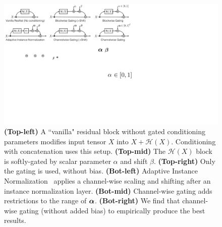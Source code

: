 \documentclass[10pt,twocolumn,letterpaper]{article}
\newcommand{\rz}[1]{\textbf{\textcolor[rgb]{.54, .16, .55}{RZ: #1}}}
\begin{document}
\begin{figure}[t]
    \centering
    \includegraphics[width=.9\linewidth]{paper_images/arch_gate2.pdf}
    \caption{
    {\bf (Top-left)} A ``vanilla" residual block without gated conditioning parameters modifies input tensor $X$ into $X+\mathcal{H}(X)$. Conditioning with concatenation uses this setup. {\bf (Top-mid)} The $\mathcal{H}(X)$ block is softly-gated by scalar parameter $\alpha$ and shift $\beta$. {\bf (Top-right)} Only the gating is used, without bias. {\bf (Bot-left)} Adaptive Instance Normalization~\cite{huang2017arbitrary} applies a channel-wise scaling and shifting after an instance normalization layer. {\bf (Bot-mid)} Channel-wise gating adds restrictions to the range of $\mbox{\boldmath $\alpha$}$. {\bf (Bot-right)} We find that channel-wise gating (without added bias) to empirically produce the best results.\label{fig:arch-gate}
    \vspace{-2mm}
    }
\end{figure}
\end{document}
